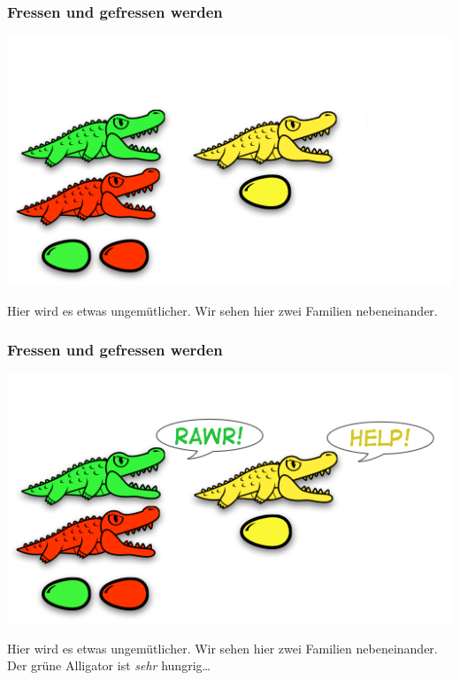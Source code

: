 \documentclass{beamer}
\begin{document}
\begin{frame}
\frametitle{Fressen und gefressen werden}

\begin{center}
\includegraphics[scale=0.45]{eating_1.png} 
\end{center}
\bigskip

Hier wird es etwas ungemütlicher. Wir sehen hier zwei Familien nebeneinander.
\end{frame}


\begin{frame}
\frametitle{Fressen und gefressen werden}

\begin{center}
\includegraphics[scale=0.45]{eating_2.png} 
\end{center}
\bigskip

Hier wird es etwas ungemütlicher. Wir sehen hier zwei Familien nebeneinander. Der grüne Alligator ist \emph{sehr} hungrig\dots
\end{frame}
\end{document}

